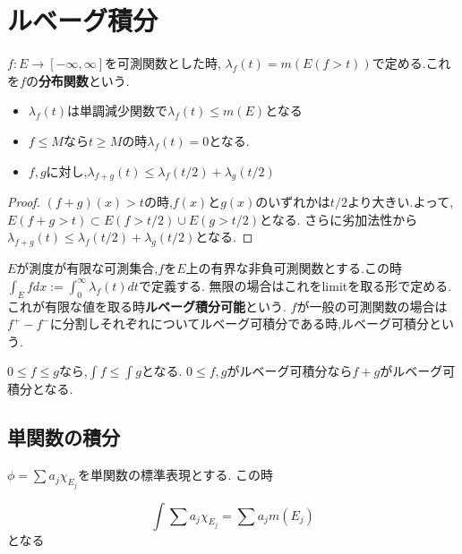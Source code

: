 \section{ルベーグ積分}
$f:E \to [-\infty, \infty]$を可測関数とした時,
$\lambda_f(t) = m(E(f> t))$で定める.これを$f$の\textbf{分布関数}という.

\begin{lem}
 \begin{itemize}
   \item $\lambda_f(t)$は単調減少関数で$\lambda_f(t) \le m(E)$となる
   \item $f \le M$なら$t \ge M$の時$\lambda_f(t)=0$となる.
   \item $f,g$に対し,$\lambda_{f+g}(t) \le \lambda_f(t/2) + \lambda_g(t/2)$
 \end{itemize}
\end{lem}
\begin{proof}
$(f+g)(x) > t$の時,$f(x)$と$g(x)$のいずれかは$t/2$より大きい.よって, $E(f+g > t) \subset E(f > t/2) \cup E(g > t/2)$となる.
さらに劣加法性から$\lambda_{f+g}(t) \le \lambda_f(t/2) + \lambda_g(t/2)$となる.
\end{proof}

\begin{screen}
\begin{dfn}
 $E$が測度が有限な可測集合,$f$を$E$上の有界な非負可測関数とする.この時$\int_E f dx := \int_0^{\infty} \lambda_f(t)dt$で定義する.
 無限の場合はこれをlimitを取る形で定める.
 これが有限な値を取る時\textbf{ルベーグ積分可能}という.
 $f$が一般の可測関数の場合は$f^+ - f^-$に分割しそれぞれについてルベーグ可積分である時,ルベーグ可積分という.
\end{dfn}
\end{screen}

\begin{prop}
 $0 \le f \le g$なら,$\int f \le \int g$となる.
 $0 \le f, g$がルベーグ可積分なら$f + g$がルベーグ可積分となる.
\end{prop}

\subsection{単関数の積分}

\begin{lem}
$\phi = \sum a_j \chi_{E_j}$を単関数の標準表現とする.
この時

\begin{equation*}
\int \sum a_j \chi_{E_j} = \sum a_j m(E_j)
\end{equation*}
となる
\end{lem}

